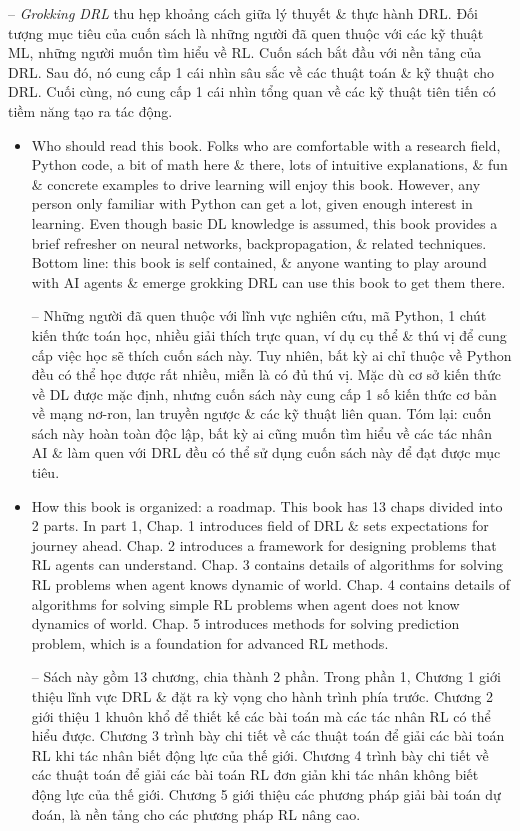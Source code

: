 \documentclass{article}
\begin{document}
\begin{itemize}
    -- {\it Grokking DRL} thu hẹp khoảng cách giữa lý thuyết \& thực hành DRL. Đối tượng mục tiêu của cuốn sách là những người đã quen thuộc với các kỹ thuật ML, những người muốn tìm hiểu về RL. Cuốn sách bắt đầu với nền tảng của DRL. Sau đó, nó cung cấp 1 cái nhìn sâu sắc về các thuật toán \& kỹ thuật cho DRL. Cuối cùng, nó cung cấp 1 cái nhìn tổng quan về các kỹ thuật tiên tiến có tiềm năng tạo ra tác động.
    \begin{itemize}
        \item {\sf Who should read this book.} Folks who are comfortable with a research field, Python code, a bit of math here \& there, lots of intuitive explanations, \& fun \& concrete examples to drive learning will enjoy this book. However, any person only familiar with Python can get a lot, given enough interest in learning. Even though basic DL knowledge is assumed, this book provides a brief refresher on neural networks, backpropagation, \& related techniques. Bottom line: this book is self contained, \& anyone wanting to play around with AI agents \& emerge grokking DRL can use this book to get them there.

        -- Những người đã quen thuộc với lĩnh vực nghiên cứu, mã Python, 1 chút kiến thức toán học, nhiều giải thích trực quan, ví dụ cụ thể \& thú vị để cung cấp việc học sẽ thích cuốn sách này. Tuy nhiên, bất kỳ ai chỉ thuộc về Python đều có thể học được rất nhiều, miễn là có đủ thú vị. Mặc dù cơ sở kiến thức về DL được mặc định, nhưng cuốn sách này cung cấp 1 số kiến thức cơ bản về mạng nơ-ron, lan truyền ngược \& các kỹ thuật liên quan. Tóm lại: cuốn sách này hoàn toàn độc lập, bất kỳ ai cũng muốn tìm hiểu về các tác nhân AI \& làm quen với DRL đều có thể sử dụng cuốn sách này để đạt được mục tiêu.
        \item {\sf How this book is organized: a roadmap.} This book has 13 chaps divided into 2 parts. In part 1, Chap. 1 introduces field of DRL \& sets expectations for journey ahead. Chap. 2 introduces a framework for designing problems that RL agents can understand. Chap. 3 contains details of algorithms for solving RL problems when agent knows dynamic of world. Chap. 4 contains details of algorithms for solving simple RL problems when agent does not know dynamics of world. Chap. 5 introduces methods for solving prediction problem, which is a foundation for advanced RL methods.

        -- Sách này gồm 13 chương, chia thành 2 phần. Trong phần 1, Chương 1 giới thiệu lĩnh vực DRL \& đặt ra kỳ vọng cho hành trình phía trước. Chương 2 giới thiệu 1 khuôn khổ để thiết kế các bài toán mà các tác nhân RL có thể hiểu được. Chương 3 trình bày chi tiết về các thuật toán để giải các bài toán RL khi tác nhân biết động lực của thế giới. Chương 4 trình bày chi tiết về các thuật toán để giải các bài toán RL đơn giản khi tác nhân không biết động lực của thế giới. Chương 5 giới thiệu các phương pháp giải bài toán dự đoán, là nền tảng cho các phương pháp RL nâng cao.


\end{itemize}
\end{itemize}
\end{document}
